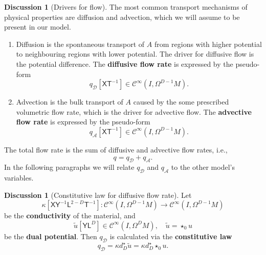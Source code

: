 \documentclass{elsarticle}
\theoremstyle{definition}
\newtheorem{discussion}[theorem]{Discussion}
\newcommand{\newterm}[1]{\textbf{#1}}
\newcommand{\amount}{\mathsf{X}}
\newcommand{\potential}{\mathsf{Y}}
\newcommand{\length}{\mathsf{L}}
\renewcommand{\time}{\mathsf{T}}
\newcommand{\diffusive}{\mathcal{D}}
\newcommand{\advective}{\mathcal{A}}
\begin{document}
\begin{discussion}[Drivers for flow]
  The most common transport mechanisms of physical properties are diffusion and advection, which we will assume to be present in our model.
  \begin{enumerate}
    \item
      Diffusion is the spontaneous transport of $A$ from regions with higher potential to neighbouring regions with lower potential. The driver for diffusive flow is the potential difference.
      The \newterm{diffusive flow rate} is expressed by the pseudo-form
      \begin{equation}
        \label{eq:continuum/diffusive_flow_rate_definition}
        q_{\diffusive} [\amount \time^{-1}] \in \mathcal{C}^\infty(I, \Omega^{D - 1} M).
      \end{equation}
    \item
      Advection is the bulk transport of $A$ caused by the some prescribed volumetric flow rate, which is the driver for advective flow.
      The \newterm{advective flow rate} is expressed by the pseudo-form
      \begin{equation}
        \label{eq:continuum/advective_flow_rate_definition}
        q_{\advective} [\amount \time^{-1}] \in \mathcal{C}^\infty(I, \Omega^{D - 1} M).
      \end{equation}
  \end{enumerate}
  The total flow rate is the sum of diffusive and advective flow rates, i.e.,
  \begin{equation}
    \label{eq:continuum/flow_rate_decomposition}
    q = q_{\diffusive} + q_{\advective}.
  \end{equation}
  In the following paragraphs we will relate $q_{\diffusive}$ and $q_{\advective}$ to the other model's variables.
\end{discussion}
\begin{discussion}[Constitutive law for diffusive flow rate]
  Let
  \begin{equation}
    \label{eq:continuum/conductivity_definition}
    \kappa [\amount \potential^{-1} \length^{2 - D} \time^{-1}] \colon \mathcal{C}^\infty(I, \Omega^{D - 1} M) \to \mathcal{C}^\infty(I, \Omega^{D - 1} M)
  \end{equation}
  be the \newterm{conductivity} of the material, and
  \begin{equation}
    \label{eq:continuum/dual_potential_definition}
    \tilde{u} [\potential \length^{D}] \in \mathcal{C}^\infty(I, \Omega^D M), \quad
    \tilde{u} = \star_0 u
  \end{equation}
  be the \newterm{dual potential}.
  Then $q_{\diffusive}$ is calculated via the \newterm{constitutive law}
  \begin{equation}
    \label{eq:continuum/constitutive_law}
    q_{\diffusive}
    = \kappa d^\star_D \tilde{u}
    = \kappa d^\star_D \star_0 u.
  \end{equation}
\end{discussion}
\end{document}
